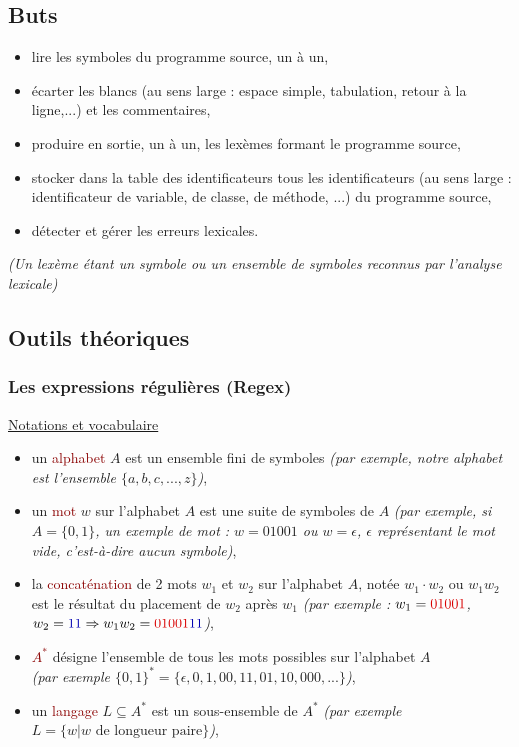 \documentclass{article}
\newcommand{\blu}[1]{\textcolor{darkblue}{#1}}
\newcommand{\red}[1]{\textcolor{darkred}{#1}}
\begin{document}
\subsection{Buts}

\begin{itemize}
\item lire les symboles du programme source, un à un,
\item écarter les blancs (au sens large : espace simple, tabulation, retour à la ligne,...) et les commentaires,
\item produire en sortie, un à un, les lexèmes formant le programme source,
\item stocker dans la table des identificateurs tous les identificateurs (au sens large : identificateur de variable, de classe, de méthode, ...) du programme source,
\item détecter et gérer les erreurs lexicales. \\
\end{itemize}

\textit{(Un lexème étant un symbole ou un ensemble de symboles reconnus par l'analyse lexicale)}

\subsection{Outils théoriques}

\subsubsection{Les expressions régulières (Regex)}

\noindent \underline{Notations et vocabulaire}

\begin{itemize}
\item un \red{alphabet} $A$ est un ensemble fini de symboles \textit{(par exemple, notre alphabet est l'ensemble $\{a, b, c, ..., z\}$)},
\item un \red{mot} $w$ sur l'alphabet $A$ est une suite de symboles de $A$ \textit{(par exemple, si $A=\{0,1\}$, un exemple de mot : $w=01001$ ou $w=\epsilon$, $\epsilon$ 
représentant le mot vide, c'est-à-dire aucun symbole)},
\item la \red{concaténation} de 2 mots $w_1$ et $w_2$ sur l'alphabet $A$, notée $w_1\cdot w_2$ ou $w_1w_2$ est le résultat du placement de $w_2$ après $w_1$ 
\textit{(par exemple : $w_1 = \red{01001}$, $w_2 = \blu{11} \Rightarrow w_1w_2 = \red{01001}\blu{11}$)},
\item \red{$A^*$} désigne l'ensemble de tous les mots possibles sur l'alphabet $A$ \\ \textit{(par exemple $\{0,1\}^* = \{\epsilon,0,1,00,11,01,10,000,... \}$)},
\item un \red{langage} $L\subseteq A^*$ est un sous-ensemble de $A^*$ \textit{(par exemple $L = \{w|w\text{ de longueur paire}\}$)}, \\
\end{itemize}
\end{document}
